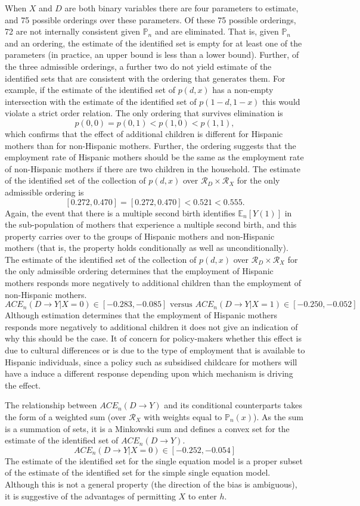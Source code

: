 \documentclass[12pt,a4paper,twoside]{article}
\numberwithin{equation}{section}
\begin{document}
When $X$ and $D$ are both binary variables there are four parameters to estimate, and 75 possible orderings over these parameters. Of these 75 possible orderings, 72 are not internally consistent given $\mathbb{P}_n$ and are eliminated. That is, given $\mathbb{P}_n$ and an ordering, the estimate of the identified set is empty for at least one of the parameters (in practice, an upper bound is less than a lower bound). Further, of the three admissible orderings, a further two do not yield estimate of the identified sets that are consistent with the ordering that generates them. For example, if the estimate of the identified set of $p(d,x)$ has a non-empty intersection with the estimate of the identified set of $p(1-d,1-x)$ this would violate a strict order relation. The only ordering that survives elimination is
\[p(0,0)=p(0,1)<p(1,0)<p(1,1),\]
which confirms that the effect of additional children is different for Hispanic mothers than for non-Hispanic mothers. Further, the ordering suggests that the employment rate of Hispanic mothers should be the same as the employment rate of non-Hispanic mothers if there are two children in the household. The estimate of the identified set of the collection of $p(d,x)$ over $\mathcal{R}_D\times\mathcal{R}_X$ for the only admissible ordering is
\[[0.272,0.470]=[0.272,0.470]<0.521<0.555.\]
Again, the event that there is a multiple second birth identifies $\mathbb{E}_n[Y(1)]$ in the sub-population of mothers that experience a multiple second birth, and this property carries over to the groups of Hispanic mothers and non-Hispanic mothers (that is, the property holds conditionally as well as unconditionally). The estimate of the identified set of the collection of $p(d,x)$ over $\mathcal{R}_D\times\mathcal{R}_X$ for the only admissible ordering determines that the employment of Hispanic mothers responds more negatively to additional children than the employment of non-Hispanic mothers.  
\[ACE_n(D\rightarrow Y|X=0)\in[-0.283,-0.085]\text{ versus }ACE_n(D\rightarrow Y|X=1)\in[-0.250,-0.052]\] 
Although estimation determines that the employment of Hispanic mothers responds more negatively to additional children it does not give an indication of why this should be the case. It of concern for policy-makers whether this effect is due to cultural differences or is due to the type of employment that is available to Hispanic individuals, since a policy such as subsidised childcare for mothers will have a induce a different response depending upon which mechanism is driving the effect.

The relationship between $ACE_n(D\rightarrow Y)$ and its conditional counterparts takes the form of a weighted sum (over $\mathcal{R}_X$ with weights equal to $\mathbb{P}_n(x)$). As the sum is a summation of sets, it is a Minkowski sum and defines a convex set for the estimate of the identified set of $ACE_n(D\rightarrow Y)$. 
\[ACE_n(D\rightarrow Y|X=0)\in[-0.252,-0.054]\]
The estimate of the identified set for the single equation model is a proper subset of the estimate of the identified set for the simple single equation model. Although this is not a general property (the direction of the bias is ambiguous), it is suggestive of the advantages of permitting $X$ to enter $h$.
\end{document}

